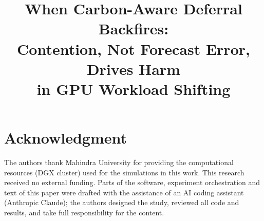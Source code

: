 \documentclass[conference]{IEEEtran}
\begin{document}
\title{When Carbon-Aware Deferral Backfires:\\Contention, Not Forecast Error, Drives Harm\\in GPU Workload Shifting}

\author{
}

\maketitle












\section*{Acknowledgment}
The authors thank Mahindra University for providing the computational resources (DGX cluster) used
for the simulations in this work. This research received no external funding. Parts of the software,
experiment orchestration and text of this paper were drafted with the assistance of an AI coding
assistant (Anthropic Claude); the authors designed the study, reviewed all code and results, and take
full responsibility for the content.



\end{document}
